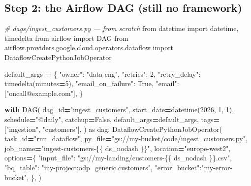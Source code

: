 \documentclass[
  11pt,
  british,
  oneside]{book}
\newenvironment{Shaded}{\begin{snugshade}}{\end{snugshade}}
\newcommand{\CommentTok}[1]{\textcolor[rgb]{0.56,0.35,0.01}{\textit{#1}}}
\newcommand{\ControlFlowTok}[1]{\textcolor[rgb]{0.13,0.29,0.53}{\textbf{#1}}}
\newcommand{\DecValTok}[1]{\textcolor[rgb]{0.00,0.00,0.81}{#1}}
\newcommand{\ImportTok}[1]{#1}
\newcommand{\NormalTok}[1]{#1}
\newcommand{\OperatorTok}[1]{\textcolor[rgb]{0.81,0.36,0.00}{\textbf{#1}}}
\newcommand{\SpecialCharTok}[1]{\textcolor[rgb]{0.00,0.00,0.00}{#1}}
\newcommand{\StringTok}[1]{\textcolor[rgb]{0.31,0.60,0.02}{#1}}
\newcommand{\VariableTok}[1]{\textcolor[rgb]{0.00,0.00,0.00}{#1}}
\begin{document}
\hypertarget{step-2-the-airflow-dag-still-no-framework}{%
\subsection{Step 2: the Airflow DAG (still no
framework)}\label{step-2-the-airflow-dag-still-no-framework}}

\begin{Shaded}
\begin{Highlighting}[]
\CommentTok{\# dags/ingest\_customers.py  — from scratch}
\ImportTok{from}\NormalTok{ datetime }\ImportTok{import}\NormalTok{ datetime, timedelta}
\ImportTok{from}\NormalTok{ airflow }\ImportTok{import}\NormalTok{ DAG}
\ImportTok{from}\NormalTok{ airflow.providers.google.cloud.operators.dataflow }\ImportTok{import}\NormalTok{ DataflowCreatePythonJobOperator}

\NormalTok{default\_args }\OperatorTok{=}\NormalTok{ \{}
    \StringTok{"owner"}\NormalTok{: }\StringTok{"data{-}eng"}\NormalTok{,}
    \StringTok{"retries"}\NormalTok{: }\DecValTok{2}\NormalTok{,}
    \StringTok{"retry\_delay"}\NormalTok{: timedelta(minutes}\OperatorTok{=}\DecValTok{5}\NormalTok{),}
    \StringTok{"email\_on\_failure"}\NormalTok{: }\VariableTok{True}\NormalTok{,}
    \StringTok{"email"}\NormalTok{: [}\StringTok{"oncall@example.com"}\NormalTok{],}
\NormalTok{\}}

\ControlFlowTok{with}\NormalTok{ DAG(}
\NormalTok{    dag\_id}\OperatorTok{=}\StringTok{"ingest\_customers"}\NormalTok{,}
\NormalTok{    start\_date}\OperatorTok{=}\NormalTok{datetime(}\DecValTok{2026}\NormalTok{, }\DecValTok{1}\NormalTok{, }\DecValTok{1}\NormalTok{),}
\NormalTok{    schedule}\OperatorTok{=}\StringTok{"@daily"}\NormalTok{,}
\NormalTok{    catchup}\OperatorTok{=}\VariableTok{False}\NormalTok{,}
\NormalTok{    default\_args}\OperatorTok{=}\NormalTok{default\_args,}
\NormalTok{    tags}\OperatorTok{=}\NormalTok{[}\StringTok{"ingestion"}\NormalTok{, }\StringTok{"customers"}\NormalTok{],}
\NormalTok{) }\ImportTok{as}\NormalTok{ dag:}
\NormalTok{    DataflowCreatePythonJobOperator(}
\NormalTok{        task\_id}\OperatorTok{=}\StringTok{"run\_dataflow"}\NormalTok{,}
\NormalTok{        py\_file}\OperatorTok{=}\StringTok{"gs://my{-}bucket/code/ingest\_customers.py"}\NormalTok{,}
\NormalTok{        job\_name}\OperatorTok{=}\StringTok{"ingest{-}customers{-}}\SpecialCharTok{\{\{}\StringTok{ ds\_nodash }\SpecialCharTok{\}\}}\StringTok{"}\NormalTok{,}
\NormalTok{        location}\OperatorTok{=}\StringTok{"europe{-}west2"}\NormalTok{,}
\NormalTok{        options}\OperatorTok{=}\NormalTok{\{}
            \StringTok{"input\_file"}\NormalTok{: }\StringTok{"gs://my{-}landing/customers{-}}\SpecialCharTok{\{\{}\StringTok{ ds\_nodash }\SpecialCharTok{\}\}}\StringTok{.csv"}\NormalTok{,}
            \StringTok{"bq\_table"}\NormalTok{:    }\StringTok{"my{-}project:odp\_generic.customers"}\NormalTok{,}
            \StringTok{"error\_bucket"}\NormalTok{:}\StringTok{"my{-}error{-}bucket"}\NormalTok{,}
\NormalTok{        \},}
\NormalTok{    )}
\end{Highlighting}
\end{Shaded}
\end{document}
